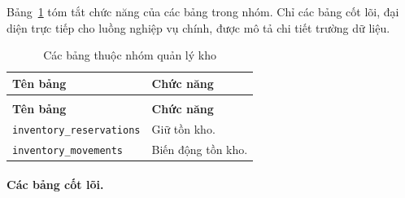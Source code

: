 Bảng~\ref{tab:data-summary-inventory} tóm tắt chức năng của các bảng trong nhóm. Chỉ các bảng cốt lõi, đại diện trực tiếp cho luồng nghiệp vụ chính, được mô tả chi tiết trường dữ liệu.

\begin{longtable}{|>{\RaggedRight\arraybackslash}p{}|>{\RaggedRight\arraybackslash}p{}|}
    \caption{Các bảng thuộc nhóm quản lý kho}
    \label{tab:data-summary-inventory} \\
    \hline
    \textbf{Tên bảng} & \textbf{Chức năng} \\
    \hline
    \endfirsthead
    \multicolumn{2}{c}{\tablename\ \thetable\ (tiếp theo)} \\
    \hline
    \textbf{Tên bảng} & \textbf{Chức năng} \\
    \hline
    \endhead
    \texttt{inventory\_reservations} & Giữ tồn kho. \\
    \hline
    \texttt{inventory\_movements} & Biến động tồn kho. \\
    \hline
\end{longtable}

\paragraph{Các bảng cốt lõi.}

